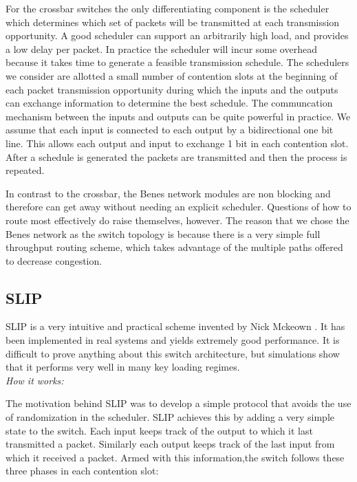 \documentclass{IEEEtran}%
\begin{document}
For the crossbar switches the only differentiating component is the scheduler which determines which set of packets will be transmitted at each transmission opportunity.  A good scheduler can support an arbitrarily high load, and provides a low delay per packet.  In practice the scheduler will incur some overhead because it takes time to generate a feasible transmission schedule.  The schedulers we consider are allotted a small number of contention slots at the beginning of each packet transmission opportunity during which the inputs and the outputs can exchange information to determine the best schedule.  The communcation mechanism between the inputs and outputs can be quite powerful in practice.  We assume that each input is connected to each output by a bidirectional one bit line. This allows each output and input to exchange 1 bit in each contention slot.  After a schedule is generated the packets are transmitted and then the process is repeated.  %

In contrast to the crossbar, the Benes network modules are non blocking and therefore can get away without needing an explicit scheduler.  Questions of how to route most effectively do raise themselves, however.  The reason that we chose the Benes network as the switch topology is because there is a very simple full throughput routing scheme, which takes advantage of the multiple paths offered to decrease congestion.


\subsection{SLIP}


SLIP is a very intuitive and practical scheme invented by Nick Mckeown \cite{McKeown}.  It has been implemented in real systems and yields extremely good performance.  It is difficult to prove anything about this switch architecture, but simulations show that it performs very well in many key loading regimes.\\

{\it How it works:}

The motivation behind SLIP was to develop a simple protocol that avoids the use of randomization in the scheduler.  SLIP achieves this by adding a very simple state to the switch.  Each input keeps track of the output to which it last transmitted a packet.  Similarly each output keeps track of the last input from which it received a packet.  Armed with this information,the switch follows these three phases in each contention slot:\\
\end{document}
